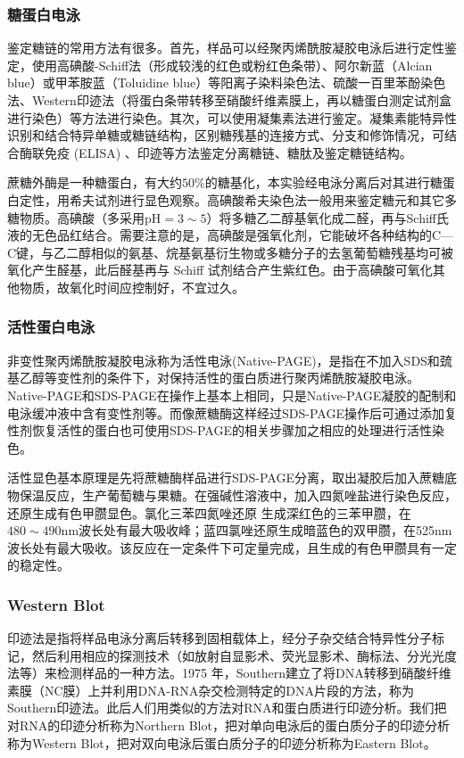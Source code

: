 \subsubsection{糖蛋白电泳}
鉴定糖链的常用方法有很多。首先，样品可以经聚丙烯酰胺凝胶电泳后进行定性鉴定，使用高碘酸-Schiff法（形成较浅的红色或粉红色条带）、阿尔新蓝（Alcian blue）或甲苯胺蓝（Toluidine blue）等阳离子染料染色法、硫酸一百里苯酚染色法、Western印迹法（将蛋白条带转移至硝酸纤维素膜上，再以糖蛋白测定试剂盒进行染色）等方法进行染色。其次，可以使用凝集素法进行鉴定。凝集素能特异性识别和结合特异单糖或糖链结构，区别糖残基的连接方式、分支和修饰情况，可结合酶联免疫 (ELISA) 、印迹等方法鉴定分离糖链、糖肽及鉴定糖链结构。

蔗糖外酶是一种糖蛋白，有大约$50\%$的糖基化，本实验经电泳分离后对其进行糖蛋白定性，用希夫试剂进行显色观察。高碘酸希夫染色法一般用来鉴定糖元和其它多糖物质。高碘酸（多采用$\mathrm{pH}=3\sim5$）将多糖乙二醇基氧化成二醛，再与Schiff氏液的无色品红结合。需要注意的是，高碘酸是强氧化剂，它能破坏各种结构的C—C键，与乙二醇相似的氨基、烷基氨基衍生物或多糖分子的去氢葡萄糖残基均可被氧化产生醛基，此后醛基再与 Schiff 试剂结合产生紫红色。由于高碘酸可氧化其他物质，故氧化时间应控制好，不宜过久。

\subsubsection{活性蛋白电泳}
非变性聚丙烯酰胺凝胶电泳称为活性电泳(Native-PAGE)，是指在不加入SDS和巯基乙醇等变性剂的条件下，对保持活性的蛋白质进行聚丙烯酰胺凝胶电泳。Native-PAGE和SDS-PAGE在操作上基本上相同，只是Native-PAGE凝胶的配制和电泳缓冲液中含有变性剂等。而像蔗糖酶这样经过SDS-PAGE操作后可通过添加复性剂恢复活性的蛋白也可使用SDS-PAGE的相关步骤加之相应的处理进行活性染色。

活性显色基本原理是先将蔗糖酶样品进行SDS-PAGE分离，取出凝胶后加入蔗糖底物保温反应，生产葡萄糖与果糖。在强碱性溶液中，加入四氮唑盐进行染色反应，还原生成有色甲臜显色。氯化三苯四氮唑还原
生成深红色的三苯甲臜，在$480\sim490\mathrm{nm}$波长处有最大吸收峰；蓝四氯唑还原生成暗蓝色的双甲臜，在525nm波长处有最大吸收。该反应在一定条件下可定量完成，且生成的有色甲臜具有一定的稳定性。

\subsubsection{Western Blot}
印迹法是指将样品电泳分离后转移到固相载体上，经分子杂交结合特异性分子标记，然后利用相应的探测技术（如放射自显影术、荧光显影术、酶标法、分光光度法等）来检测样品的一种方法。1975 年，Southern建立了将DNA转移到硝酸纤维素膜（NC膜）上并利用DNA-RNA杂交检测特定的DNA片段的方法，称为Southern印迹法。此后人们用类似的方法对RNA和蛋白质进行印迹分析。我们把对RNA的印迹分析称为Northern Blot，把对单向电泳后的蛋白质分子的印迹分析称为Western Blot，把对双向电泳后蛋白质分子的印迹分析称为Eastern Blot。

